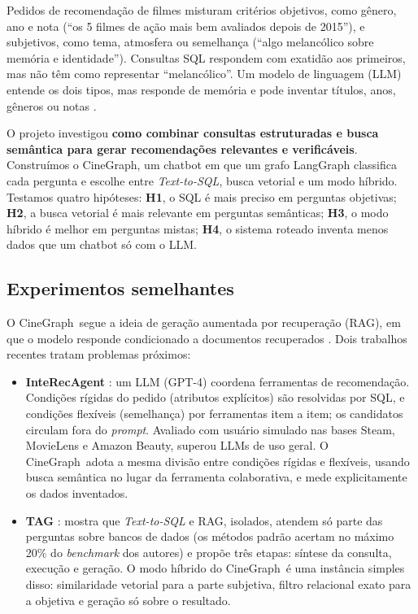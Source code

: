 \documentclass[11pt,a4paper]{article}
\newcommand{\cg}{CineGraph}
\begin{document}
Pedidos de recomendação de filmes misturam critérios objetivos, como gênero, ano e nota
(\enquote{os 5 filmes de ação mais bem avaliados depois de 2015}), e subjetivos, como tema,
atmosfera ou semelhança (\enquote{algo melancólico sobre memória e identidade}). Consultas
SQL respondem com exatidão aos primeiros, mas não têm como representar
\enquote{melancólico}. Um modelo de linguagem (LLM) entende os dois tipos, mas responde de
memória e pode inventar títulos, anos, gêneros ou notas \cite{ji2023hallucination}.

O projeto investigou \textbf{como combinar consultas estruturadas e busca semântica para
gerar recomendações relevantes e verificáveis}. Construímos o \cg, um chatbot em que um
grafo LangGraph classifica cada pergunta e escolhe entre \emph{Text-to-SQL}, busca vetorial
e um modo híbrido. Testamos quatro hipóteses: \textbf{H1}, o SQL é mais preciso em perguntas
objetivas; \textbf{H2}, a busca vetorial é mais relevante em perguntas semânticas;
\textbf{H3}, o modo híbrido é melhor em perguntas mistas; \textbf{H4}, o sistema roteado
inventa menos dados que um chatbot só com o LLM.

\subsection{Experimentos semelhantes}

O \cg\ segue a ideia de geração aumentada por recuperação (RAG), em que o modelo responde
condicionado a documentos recuperados \cite{lewis2020rag}. Dois trabalhos recentes tratam
problemas próximos:

\begin{itemize}
  \item \textbf{InteRecAgent} \cite{huang2025interecagent}: um LLM (GPT-4) coordena
        ferramentas de recomendação. Condições rígidas do pedido (atributos explícitos) são
        resolvidas por SQL, e condições flexíveis (semelhança) por ferramentas item a item;
        os candidatos circulam fora do \emph{prompt}. Avaliado com usuário simulado nas
        bases Steam, MovieLens e Amazon Beauty, superou LLMs de uso geral. O \cg\ adota a
        mesma divisão entre condições rígidas e flexíveis, usando busca semântica no lugar
        da ferramenta colaborativa, e mede explicitamente os dados inventados.
  \item \textbf{TAG} \cite{biswal2025tag}: mostra que \emph{Text-to-SQL} e RAG, isolados,
        atendem só parte das perguntas sobre bancos de dados (os métodos padrão acertam no
        máximo 20\% do \emph{benchmark} dos autores) e propõe três etapas: síntese da
        consulta, execução e geração. O modo híbrido do \cg\ é uma instância simples disso:
        similaridade vetorial para a parte subjetiva, filtro relacional exato para a
        objetiva e geração só sobre o resultado.
\end{itemize}
\end{document}
